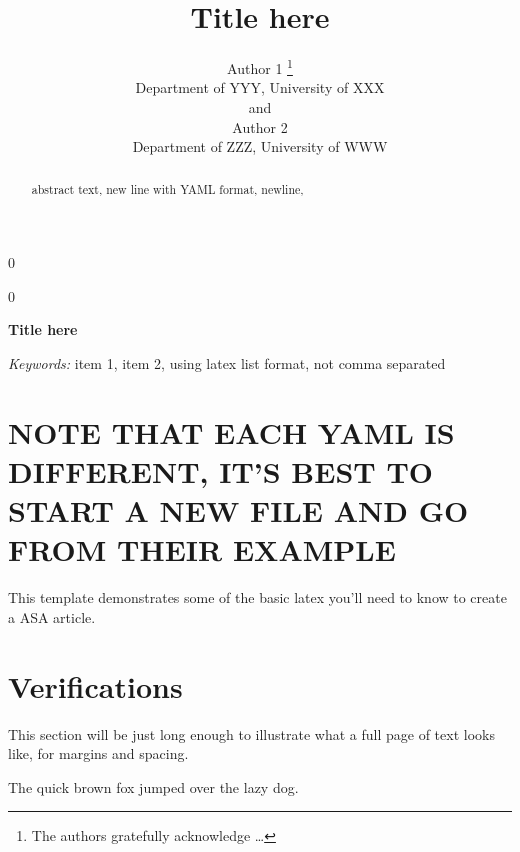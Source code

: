 \documentclass[12pt]{article}
\newcommand{\blind}{0}
\begin{document}
\def\spacingset#1{\renewcommand{\baselinestretch}%
{#1}\small\normalsize} \spacingset{1}



\blind
{
  \title{\bf Title here}

  \author{
        Author 1 \thanks{The authors gratefully acknowledge \ldots{}} \\
    Department of YYY, University of XXX\\
     and \\     Author 2 \\
    Department of ZZZ, University of WWW\\
      }
  \maketitle
} \fi

\blind
{
  \bigskip
  \bigskip
  \bigskip
  \begin{center}
    {\LARGE\bf Title here}
  \end{center}
  \medskip
} \fi

\bigskip
\begin{abstract}
abstract text, new line with YAML format, \textbar{} newline, \textbar{}
\end{abstract}

\noindent%
{\it Keywords:} item 1, item 2, using latex list format, not comma
separated
\vfill

\newpage
\spacingset{1.45} %

\hypertarget{note-that-each-yaml-is-different-its-best-to-start-a-new-file-and-go-from-their-example}{%
\section{NOTE THAT EACH YAML IS DIFFERENT, IT'S BEST TO START A NEW FILE
AND GO FROM THEIR
EXAMPLE}\label{note-that-each-yaml-is-different-its-best-to-start-a-new-file-and-go-from-their-example}}

This template demonstrates some of the basic latex you'll need to know
to create a ASA article.

\section{Verifications}
\label{sec:verify}

This section will be just long enough to illustrate what a full page of
text looks like, for margins and spacing.

\citet{Campbell02} \citeauthor{Schubert13}
\citetext{\citeyear{Schubert13}; \citealp{Chi81}}

The quick brown fox jumped over the lazy dog.



\end{document}
